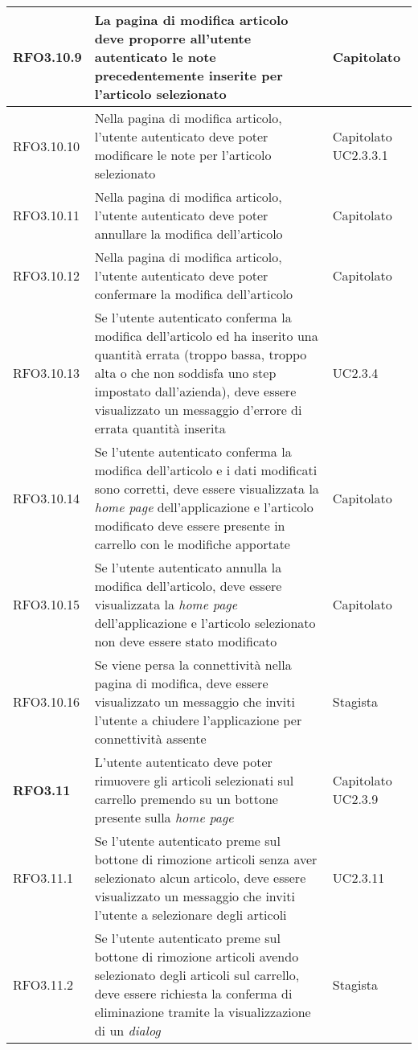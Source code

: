 {\begin{center}
\begin{longtable}{ | >{\centering\arraybackslash}p{2.5cm} | >{\arraybackslash}p{7cm} | >{\centering\arraybackslash}p{2cm} | }
RFO3.10.9 & La pagina di modifica articolo deve proporre all'utente autenticato le note precedentemente inserite per l'articolo selezionato & Capitolato \\ \hline
RFO3.10.10 & Nella pagina di modifica articolo, l'utente autenticato deve poter modificare le note per l'articolo selezionato & Capitolato UC2.3.3.1 \\ \hline
RFO3.10.11 & Nella pagina di modifica articolo, l'utente autenticato deve poter annullare la modifica dell'articolo & Capitolato \\ \hline
RFO3.10.12 & Nella pagina di modifica articolo, l'utente autenticato deve poter confermare la modifica dell'articolo & Capitolato \\ \hline
RFO3.10.13 & Se l'utente autenticato conferma la modifica dell'articolo ed ha inserito una quantità errata (troppo bassa, troppo alta o che non soddisfa uno step impostato dall'azienda), deve essere visualizzato un messaggio d'errore di errata quantità inserita & UC2.3.4 \\ \hline
RFO3.10.14 & Se l'utente autenticato conferma la modifica dell'articolo e i dati modificati sono corretti, deve essere visualizzata la \textit{home page} dell'applicazione e l'articolo modificato deve essere presente in carrello con le modifiche apportate & Capitolato \\ \hline
RFO3.10.15 & Se l'utente autenticato annulla la modifica dell'articolo, deve essere visualizzata la \textit{home page} dell'applicazione e l'articolo selezionato non deve essere stato modificato & Capitolato \\ \hline
RFO3.10.16 & Se viene persa la connettività nella pagina di modifica, deve essere visualizzato un messaggio che inviti l'utente a chiudere l'applicazione per connettività assente & Stagista \\ \hline
\textbf{RFO3.11} & L'utente autenticato deve poter rimuovere gli articoli selezionati sul carrello premendo su un bottone presente sulla \textit{home page} & Capitolato UC2.3.9 \\ \hline
RFO3.11.1 & Se l'utente autenticato preme sul bottone di rimozione articoli senza aver selezionato alcun articolo, deve essere visualizzato un messaggio che inviti l'utente a selezionare degli articoli & UC2.3.11 \\ \hline
RFO3.11.2 & Se l'utente autenticato preme sul bottone di rimozione articoli avendo selezionato degli articoli sul carrello, deve essere richiesta la conferma di eliminazione tramite la visualizzazione di un \textit{dialog} & Stagista \\ \hline

\end{longtable}
\end{center}}
